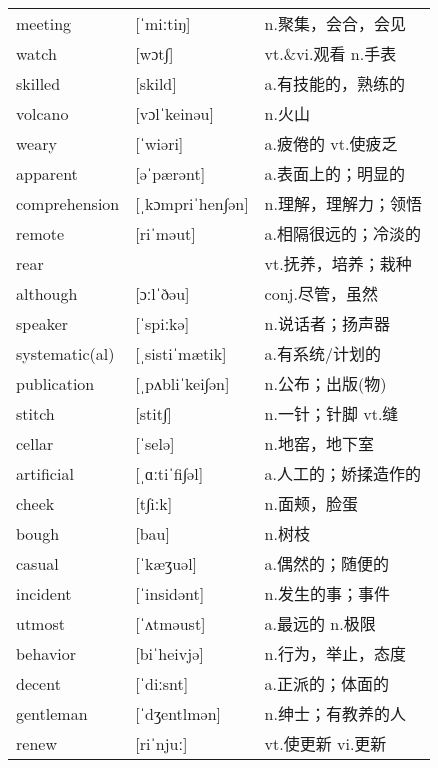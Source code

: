 \documentclass[a4paper]{article}
\begin{document}
\section{}
\begin{tabular}{l l l}

meeting & [ˈmiːtiŋ] & n.聚集，会合，会见 \\
watch & [wɔt∫] & vt.\&vi.观看 n.手表 \\
skilled & [skild] & a.有技能的，熟练的 \\
volcano & [vɔlˈkeinəu] & n.火山 \\
weary & [ˈwiəri] & a.疲倦的 vt.使疲乏 \\
apparent & [əˈpærənt] & a.表面上的；明显的 \\
comprehension & [ˌkɔmpriˈhen∫ən] & n.理解，理解力；领悟 \\
remote & [riˈməut] & a.相隔很远的；冷淡的 \\
rear &  & vt.抚养，培养；栽种 \\
although & [ɔːlˈðəu] & conj.尽管，虽然 \\
speaker & [ˈspiːkə] & n.说话者；扬声器 \\
systematic(al) & [ˌsistiˈmætik] & a.有系统/计划的 \\
publication & [ˌpʌbliˈkei∫ən] & n.公布；出版(物) \\
stitch & [stit∫] & n.一针；针脚 vt.缝 \\
cellar & [ˈselə] & n.地窑，地下室 \\
artificial & [ˌɑːtiˈfi∫əl] & a.人工的；娇揉造作的 \\
cheek & [t∫iːk] & n.面颊，脸蛋 \\
bough & [bau] & n.树枝 \\
casual & [ˈkæʒuəl] & a.偶然的；随便的 \\
incident & [ˈinsidənt] & n.发生的事；事件 \\
utmost & [ˈʌtməust] & a.最远的 n.极限 \\
behavior & [biˈheivjə] & n.行为，举止，态度 \\
decent & [ˈdiːsnt] & a.正派的；体面的 \\
gentleman & [ˈdʒentlmən] & n.绅士；有教养的人 \\
renew & [riˈnjuː] & vt.使更新 vi.更新 \\

\end{tabular}
\end{document}
